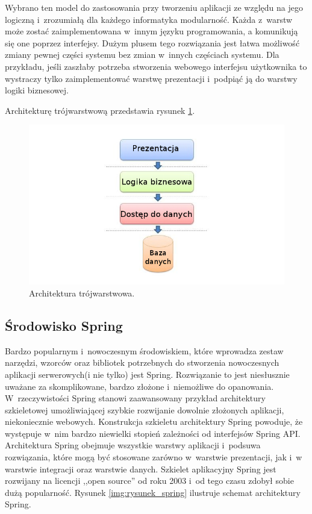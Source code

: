 Wybrano ten model do zastosowania przy tworzeniu aplikacji ze względu na jego logiczną i~zrozumiałą dla każdego informatyka modularność. Każda z~warstw może zostać zaimplementowana w~innym języku programowania, a komunikują się one poprzez interfejsy. Dużym plusem tego rozwiązania jest łatwa możliwość zmiany pewnej części systemu bez zmian w~innych częściach systemu. Dla przykładu, jeśli zaszłaby potrzeba stworzenia webowego interfejsu użytkownika to wystraczy tylko zaimplementować warstwę prezentacji i~podpiąć ją do warstwy logiki biznesowej.

Architekturę trójwarstwową przedstawia rysunek \ref{img:rysunek_3layer}.
\begin{figure}[!ht]
\centering	
\includegraphics[scale=0.5]{images/3layer-architect}
\caption[Rysunek przedstawiający model architektury trójwarstwowej]{Architektura trójwarstwowa.}
\label{img:rysunek_3layer}
\end{figure}

\subsection{Środowisko Spring}
\label{sec:modelArchitekturySpring}
Bardzo popularnym i~nowoczesnym środowiskiem, które wprowadza zestaw narzędzi, wzorców oraz bibliotek potrzebnych do stworzenia nowoczesnych aplikacji serwerowych(i nie tylko) jest Spring. Rozwiązanie to jest niesłusznie uważane za skomplikowane, bardzo złożone i~niemożliwe do opanowania. W~rzeczywistości Spring stanowi zaawansowany przykład architektury szkieletowej umożliwiającej szybkie rozwijanie dowolnie złożonych aplikacji, niekoniecznie webowych. Konstrukcja szkieletu architektury Spring powoduje, że występuje w~nim bardzo niewielki stopień zależności od interfejsów Spring API. Architektura Spring obejmuje wszystkie warstwy aplikacji i~podsuwa rozwiązania, które mogą być stosowane zarówno w~warstwie prezentacji, jak i~w warstwie integracji oraz warstwie danych. Szkielet aplikacyjny Spring jest rozwijany na licencji ,,open source'' od roku 2003 i~od tego czasu zdobył sobie dużą popularność\cite{bruce_spring}. Rysunek \ref{img:rysunek_spring} ilustruje schemat architektury Spring.


